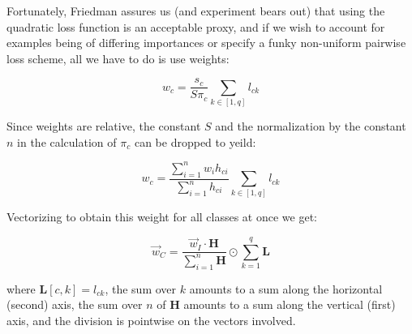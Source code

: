 \documentclass[12pt]{article}
\begin{document}
Fortunately, Friedman assures us (and experiment bears out) that using the quadratic loss function is an acceptable proxy, and if we wish to account for examples being of differing importances or specify a funky non-uniform pairwise loss scheme, all we have to do is use weights:

$$w_c = \frac{s_c}{S \pi_c} \sum_{k \in [1,q]} l_{ck}$$

Since weights are relative, the constant $S$ and the normalization by the constant $n$ in the calculation of $\pi_c$ can be dropped to yeild:

$$w_c = \frac{\sum_{i=1}^n w_i h_{ci}}{\sum_{i=1}^n h_{ci}} \sum_{k \in [1,q]} l_{ck}$$

Vectorizing to obtain this weight for all classes at once we get:

$$\vec{w}_C = \frac{\vec{w}_I \cdot \pmb{H}}{\sum_{i=1}^n \pmb{H}} \odot \sum_{k=1}^q \pmb{L}$$

where $\pmb{L}[c,k] = l_{ck}$, the sum over $k$ amounts to a sum along the horizontal (second) axis, the sum over $n$ of $\pmb{H}$ amounts to a sum along the vertical (first) axis, and the division is pointwise on the vectors involved.
\end{document}
